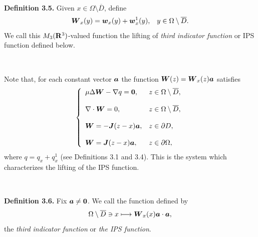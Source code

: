  
 
 
 
 $\quad$
 
 

 
 
{\bf\noindent Definition 3.5.}  
 Given $x\in\Omega\setminus\overline{D}$, define
$$\begin{array}{ll}
\displaystyle
\mbox{\boldmath $W$}_x(y)=\mbox{\boldmath $w$}_x(y)+\mbox{\boldmath $w$}_x^1(y),
&
\displaystyle
y\in\Omega\setminus\overline{D}.
\end{array}
$$
We call this $M_3(\Bbb R^3)$-valued function the lifting of  {\it third indicator function} or IPS function 
defined below.



$\quad$

Note that, for each constant vector $\mbox{\boldmath $a$}$
the function $\mbox{\boldmath $W$}(z)=\mbox{\boldmath $W$}_x(z)\mbox{\boldmath $a$}$ satisfies
$$\left\{
 \begin{array}{ll}
 \mu\Delta\mbox{\boldmath $W$}-\nabla q=\mbox{\boldmath $0$}, & z\in\Omega\setminus\overline{D},
 \\
 \\
 \displaystyle
 \nabla\cdot\mbox{\boldmath $W$}=0, &  z\in\Omega\setminus\overline{D},\\
 \\
 \displaystyle
 \mbox{\boldmath $W$}=-\mbox{\boldmath $J$}(z-x)\mbox{\boldmath $a$}, & z\in\partial D,
 \\
 \\
 \displaystyle
 \mbox{\boldmath $W$}=\mbox{\boldmath $J$}(z-x)
 \mbox{\boldmath $a$}, & z\in\partial\Omega,
 \end{array}
 \right.
 $$
where $q=q_x+q_x^1$ (see Definitions 3.1 and 3.4).
This is the system which characterizes the lifting of the IPS function.







$\quad$







 
 
 
 {\bf\noindent Definition 3.6.}  Fix $\mbox{\boldmath $a$}\not=\mbox{\boldmath $0$}$.  We call the function defined by
 $$\displaystyle
 \Omega\setminus\overline{D}\ni x\longmapsto \mbox{\boldmath $W$}_x(x)
 \mbox{\boldmath $a$}\cdot\mbox{\boldmath $a$},
 $$
 the {\it third indicator function} or {\it the IPS function}.
 
